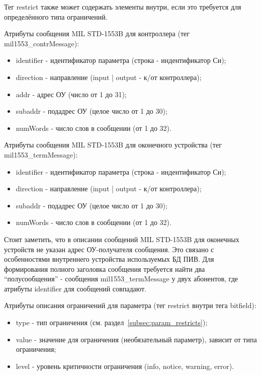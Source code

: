 Тег restrict также может содержать элементы внутри, если это требуется для 
определённого типа ограничений.

Атрибуты сообщения MIL STD-1553B для контроллера (тег mil1553\_contrMessage):

\begin{itemize}
 \item identifier - идентификатор параметра (строка - индентификатор Си);
 \item direction - направление (input | output - к/от контроллера);
 \item addr  - адрес ОУ (число от 1 до 31);
 \item subaddr - подадрес ОУ (целое число от 1 до 30);
 \item numWords - число слов в сообщении (от 1 до 32).
\end{itemize}

Атрибуты сообщения MIL STD-1553B для оконечного устройства (тег 
mil1553\_termMessage):

\begin{itemize}
 \item identifier - идентификатор параметра (строка - индентификатор Си);
 \item direction - направление (input | output - к/от контроллера);
 \item subaddr - подадрес ОУ (целое число от 1 до 30);
 \item numWords - число слов в сообщении (от 1 до 32).
\end{itemize}

Стоит заметить, что в описании сообщений MIL STD-1553B для оконечных устройств 
не указан адрес ОУ-получателя сообщения. Это связано с особенностями 
внутреннего устройства используемых БД ПИВ. Для формирования полного заголовка 
сообщения требуется найти два ``полусообщения'' - сообщения 
mil1553\_termMessage у двух абонентов, где атрибуты identifier для сообщений 
совпадают.

Атрибуты описания ограничений для параметра (тег restrict внутри тега bitfield):

\begin{itemize}
 \item type - тип ограничения (см. раздел~\ref{subsec:param_restricts});
 \item value - значение для ограничения (необязательный параметр), зависит от 
типа ограничения;
 \item level - уровень критичности ограничения (info, notice, warning, error).
\end{itemize}

